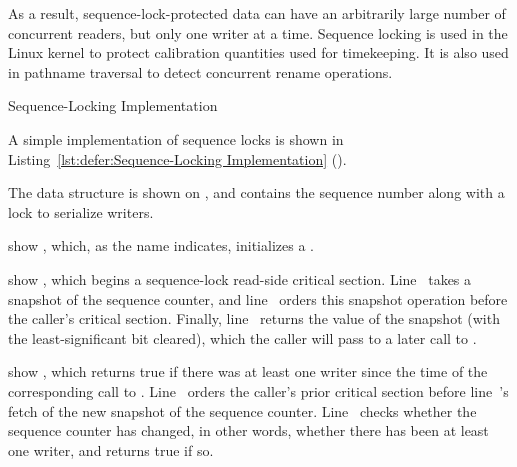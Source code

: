 As a result, sequence-lock-protected data can have an arbitrarily
large number of concurrent readers, but only one writer at a time.
Sequence locking is used in the Linux kernel to protect calibration
quantities used for timekeeping.
It is also used in pathname traversal to detect concurrent rename operations.

\begin{listing}[tb]

\caption{Sequence-Locking Implementation}
\label{lst:defer:Sequence-Locking Implementation}
\end{listing}

A simple implementation of sequence locks is shown in
Listing~\ref{lst:defer:Sequence-Locking Implementation}
().
\begin{fcvref}
The  data structure is shown on
, and contains
the sequence number along with a lock to serialize writers.
\end{fcvref}
\begin{fcvref}
 show , which, as the name indicates,
initializes a .
\end{fcvref}

\begin{fcvref}
 show , which begins a sequence-lock
read-side critical section.
Line~ takes a snapshot of the sequence counter, and
line~ orders
this snapshot operation before the caller's critical section.
Finally, line~ returns the value of the snapshot (with the least-significant
bit cleared), which the caller
will pass to a later call to .
\end{fcvref}

\QuickQuizEnd

\begin{fcvref}
 show , which returns true if there
was at least one writer since the time of the corresponding
call to .
Line~ orders the caller's prior critical section before line~'s
fetch of the new snapshot of the sequence counter.
Line~ checks whether the sequence counter has changed,
in other words, whether there has been at least one writer, and returns
true if so.
\end{fcvref}

